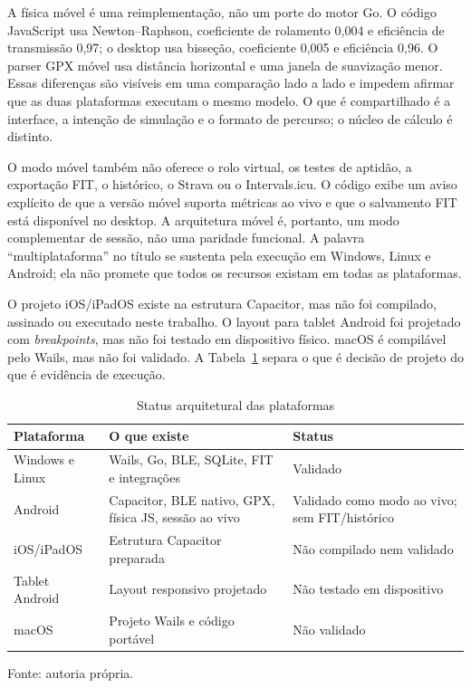 A física móvel é uma reimplementação, não um porte do motor Go. O código
JavaScript usa Newton--Raphson, coeficiente de rolamento 0,004 e eficiência de
transmissão 0,97; o desktop usa bisseção, coeficiente 0,005 e eficiência 0,96.
O parser GPX móvel usa distância horizontal e uma janela de suavização menor.
Essas diferenças são visíveis em uma comparação lado a lado e impedem afirmar
que as duas plataformas executam o mesmo modelo. O que é compartilhado é a
interface, a intenção de simulação e o formato de percurso; o núcleo de cálculo
é distinto.

O modo móvel também não oferece o rolo virtual, os testes de aptidão, a
exportação FIT, o histórico, o Strava ou o Intervals.icu. O código exibe um
aviso explícito de que a versão móvel suporta métricas ao vivo e que o
salvamento FIT está disponível no desktop. A arquitetura móvel é, portanto, um
modo complementar de sessão, não uma paridade funcional. A palavra
``multiplataforma'' no título se sustenta pela execução em Windows, Linux e
Android; ela não promete que todos os recursos existam em todas as plataformas.

O projeto iOS/iPadOS existe na estrutura Capacitor, mas não foi compilado,
assinado ou executado neste trabalho. O layout para tablet Android foi
projetado com \textit{breakpoints}, mas não foi testado em dispositivo físico.
macOS é compilável pelo Wails, mas não foi validado. A
Tabela~\ref{tab:plataformas-arquitetura} separa o que é decisão de projeto do
que é evidência de execução.

\begin{table}[htbp]
    \centering
    \caption{Status arquitetural das plataformas}
    \label{tab:plataformas-arquitetura}
    \small
    \begin{tabular}{@{}>{\raggedright\arraybackslash}p{2.8cm}
        >{\raggedright\arraybackslash}p{5.2cm}
        >{\raggedright\arraybackslash}p{4.0cm}@{}}
        \toprule
        \textbf{Plataforma} & \textbf{O que existe} & \textbf{Status} \\
        \midrule
        Windows e Linux & Wails, Go, BLE, SQLite, FIT e integrações &
        Validado \\
        Android & Capacitor, BLE nativo, GPX, física JS, sessão ao vivo &
        Validado como modo ao vivo; sem FIT/histórico \\
        iOS/iPadOS & Estrutura Capacitor preparada & Não compilado nem
        validado \\
        Tablet Android & Layout responsivo projetado & Não testado em
        dispositivo \\
        macOS & Projeto Wails e código portável & Não validado \\
        \bottomrule
    \end{tabular}
    \vspace{0.2cm}
    \par\small Fonte: autoria própria.
\end{table}

